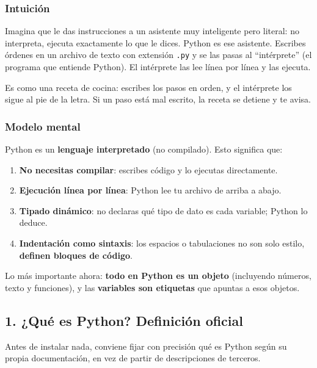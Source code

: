 \documentclass[
  doc,
  floatsintext,
  longtable,
  a4paper,
  nolmodern,
  notxfonts,
  notimes,
  12pt,
  colorlinks=true,linkcolor=blue,citecolor=blue,urlcolor=blue]{apa7}
\providecommand{\tightlist}{%
  \setlength{\itemsep}{0pt}\setlength{\parskip}{0pt}}
\begin{document}
\subsubsection{Intuición}\label{intuiciuxf3n}

Imagina que le das instrucciones a un asistente muy inteligente pero
literal: no interpreta, ejecuta exactamente lo que le dices. Python es
ese asistente. Escribes órdenes en un archivo de texto con extensión
\texttt{.py} y se las pasas al ``intérprete'' (el programa que entiende
Python). El intérprete las lee línea por línea y las ejecuta.

Es como una receta de cocina: escribes los pasos en orden, y el
intérprete los sigue al pie de la letra. Si un paso está mal escrito, la
receta se detiene y te avisa.

\subsubsection{Modelo mental}\label{modelo-mental}

Python es un \textbf{lenguaje interpretado} (no compilado). Esto
significa que:

\begin{enumerate}
\def\labelenumi{\arabic{enumi}.}
\tightlist
\item
  \textbf{No necesitas compilar}: escribes código y lo ejecutas
  directamente.
\item
  \textbf{Ejecución línea por línea}: Python lee tu archivo de arriba a
  abajo.
\item
  \textbf{Tipado dinámico}: no declaras qué tipo de dato es cada
  variable; Python lo deduce.
\item
  \textbf{Indentación como sintaxis}: los espacios o tabulaciones no son
  solo estilo, \textbf{definen bloques de código}.
\end{enumerate}

Lo más importante ahora: \textbf{todo en Python es un objeto}
(incluyendo números, texto y funciones), y las \textbf{variables son
etiquetas} que apuntas a esos objetos.

\subsection{1. ¿Qué es Python? Definición
oficial}\label{quuxe9-es-python-definiciuxf3n-oficial}

Antes de instalar nada, conviene fijar con precisión qué es Python según
su propia documentación, en vez de partir de descripciones de terceros.
\end{document}
